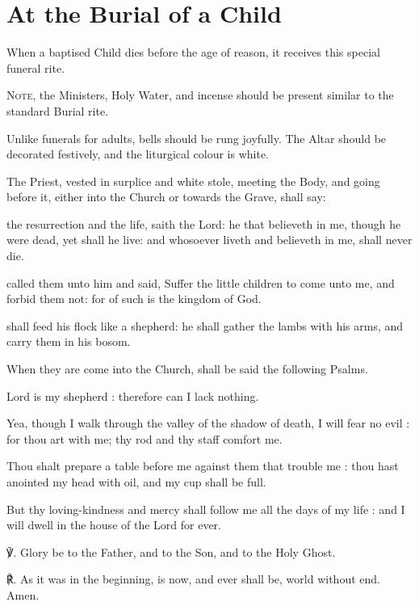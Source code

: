 \fancyhead[RE,LO]{\textit{}}
\section{At the Burial of a Child}
\begin{secrubric}
    When a baptised Child dies before the age of reason, it receives this special funeral rite.\par
    \textsc{Note,} the Ministers, Holy Water, and incense should be present similar to the standard Burial rite.
\end{secrubric}
\begin{secrubric}
    Unlike funerals for adults, bells should be rung joyfully. The Altar should be decorated festively, and the liturgical colour is white.
\end{secrubric}
\begin{secrubric}
    The Priest, vested in surplice and white stole, meeting the Body, and going before it, either into the Church or towards the Grave, shall say:
\end{secrubric}
 the resurrection and the life, saith the Lord: he that believeth in me, though he were dead, yet shall he live: and whosoever liveth and believeth in me, shall never die.

 called them unto him and said, Suffer the little children to come unto me, and forbid them not: for of such is the kingdom of God.\par
\vspace{2ex}
 shall feed his flock like a shepherd: he shall gather the lambs with his arms, and carry them in his bosom.

\begin{rubric}
    When they are come into the Church, shall be said the following Psalms.
\end{rubric}

 Lord is my shepherd : therefore can I lack nothing.\par
{}
Yea, though I walk through the valley of the shadow of death, I will fear no evil : for thou art with me; thy rod and thy staff comfort me.\par
{}Thou shalt prepare a table before me against them that trouble me : thou hast anointed my head with oil, and my cup shall be full.\par
{}But thy loving-kindness and mercy shall follow me all the days of my life : and I will dwell in the house of the Lord for ever.\par
℣. Glory be to the Father, and to the Son, and to the Holy Ghost.\par
℟. As it was in the beginning, is now, and ever shall be, world without end. Amen.

